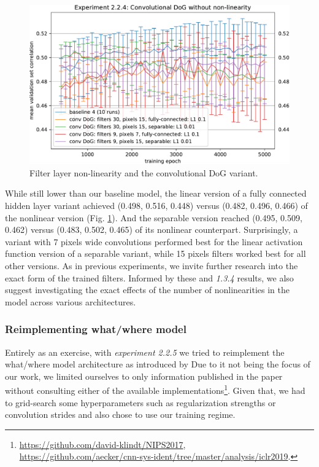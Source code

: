 \begin{figure}[H]
    \centering
    \includegraphics[width=1\textwidth]{../figures/05_2_2_4}
    \caption[Experiment 2.2.4]{Filter layer non-linearity and the convolutional DoG variant.}
    \label{fig:5.2.2.4}
\end{figure}

While still lower than our baseline model, the linear version of a fully connected hidden layer variant achieved (0.498, 0.516, 0.448) versus (0.482, 0.496, 0.466) of the nonlinear version (Fig. \ref{fig:5.2.2.4}). And the separable version reached (0.495, 0.509, 0.462) versus (0.483, 0.502, 0.465) of its nonlinear counterpart. Surprisingly, a variant with 7 pixels wide convolutions performed best for the linear activation function version of a separable variant, while 15 pixels filters worked best for all other versions. As in previous experiments, we invite further research into the exact form of the trained filters. Informed by these and \textit{1.3.4} results, we also suggest investigating the exact effects of the number of nonlinearities in the model across various architectures.

\subsubsection{Reimplementing what/where model}

Entirely as an exercise, with \textit{experiment 2.2.5} we tried to reimplement the what/\-where model architecture as introduced by \cite{klindt} Due to it not being the focus of our work, we limited ourselves to only information published in the paper without consulting either of the available implementations\footnote{\href{https://github.com/david-klindt/NIPS2017}{https://github.com/david-klindt/NIPS2017}, \\ \href{https://github.com/aecker/cnn-sys-ident/tree/master/analysis/iclr2019}{https://github.com/aecker/cnn-sys-ident/tree/master/analysis/iclr2019}.}. Given that, we had to grid-search some hyperparameters such as regularization strengths or convolution strides and also chose to use our training regime. 

